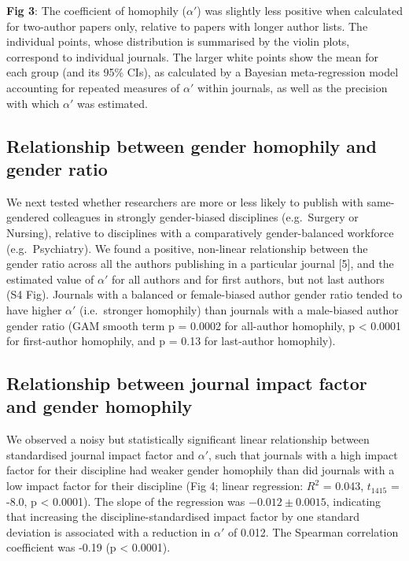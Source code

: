 \documentclass[12pt,]{article}
\begin{document}
\vspace{2cm}

\textbf{Fig 3}: The coefficient of homophily (\(\alpha'\)) was slightly
less positive when calculated for two-author papers only, relative to
papers with longer author lists. The individual points, whose
distribution is summarised by the violin plots, correspond to individual
journals. The larger white points show the mean for each group (and its
95\% CIs), as calculated by a Bayesian meta-regression model accounting
for repeated measures of \(\alpha'\) within journals, as well as the
precision with which \(\alpha'\) was estimated. \vspace{2cm}

\hypertarget{relationship-between-gender-homophily-and-gender-ratio}{%
\subsection{Relationship between gender homophily and gender
ratio}\label{relationship-between-gender-homophily-and-gender-ratio}}

We next tested whether researchers are more or less likely to publish
with same-gendered colleagues in strongly gender-biased disciplines
(e.g.~Surgery or Nursing), relative to disciplines with a comparatively
gender-balanced workforce (e.g.~Psychiatry). We found a positive,
non-linear relationship between the gender ratio across all the authors
publishing in a particular journal {[}5{]}, and the estimated value of
\(\alpha'\) for all authors and for first authors, but not last authors
(S4 Fig). Journals with a balanced or female-biased author gender ratio
tended to have higher \(\alpha'\) (i.e.~stronger homophily) than
journals with a male-biased author gender ratio (GAM smooth term p =
0.0002 for all-author homophily, p \textless{} 0.0001 for first-author
homophily, and p = 0.13 for last-author homophily).

\hypertarget{relationship-between-journal-impact-factor-and-gender-homophily}{%
\subsection{Relationship between journal impact factor and gender
homophily}\label{relationship-between-journal-impact-factor-and-gender-homophily}}

We observed a noisy but statistically significant linear relationship
between standardised journal impact factor and \(\alpha'\), such that
journals with a high impact factor for their discipline had weaker
gender homophily than did journals with a low impact factor for their
discipline (Fig 4; linear regression: \(R^2\) = 0.043, \(t_{1415}\) =
-8.0, p \textless{} 0.0001). The slope of the regression was
\(-0.012{\pm}0.0015\), indicating that increasing the
discipline-standardised impact factor by one standard deviation is
associated with a reduction in \(\alpha'\) of 0.012. The Spearman
correlation coefficient was -0.19 (p \textless{} 0.0001).
\end{document}
